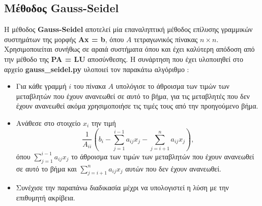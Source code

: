 \documentclass[First Project.tex]{subfiles}
\begin{document}
\subsection{ Μέθοδος \textlatin{\textbf{Gauss-Seidel}} }

Η μέθοδος \textlatin{\textbf{Gauss-Seidel}} αποτελεί μία επαναληπτική μέθοδος επίλυσης γραμμικών συστημάτων της μορφής \textlatin{\textbf{Ax = b}},
όπου $Α$ τετραγωνικός πίνακας $n \times n$. Χρησιμοποιείται συνήθως σε αραιά συστήματα όπου και έχει καλύτερη απόδοση από την μέθοδο της 
\textlatin{\textbf{PA = LU}} αποσύνθεσης. Η συνάρτηση που έχει υλοποιηθεί στο αρχείο \textlatin{\textbf{gauss\_seidel.py}} υλοποιεί τον 
παρακάτω αλγόριθμο :
\begin{itemize}
    \item Για κάθε γραμμή $i$ του πίνακα $Α$ υπολόγισε το άθροισμα των τιμών των μεταβλητών που έχουν ανανεωθεί σε αυτό το βήμα, για τις 
        μεταβλητές που δεν έχουν ανανεωθεί ακόμα χρησιμοποιήσε τις τιμές τους από την προηγούμενο βήμα.
    \item Ανάθεσε στο στοιχείο $x_{i}$ την τιμή 
    \begin{equation*}
            \frac{1}{A_{ii}}(b_{i} - \sum_{j=1}^{i-1} a_{ij}x_{j} - \sum_{j=i+1}^{n} a_{ij}x_{j}), 
    \end{equation*}
    όπου $\sum_{j=1}^{i-1} a_{ij}x_{j}$ το άθροισμα των τιμών των μεταβλητών που έχουν ανανεωθεί σε αυτό το βήμα και
    $\sum_{j=i+1}^{n} a_{ij}x_{j}$ αυτών που δεν έχουν ανανεωθεί.
    \item Συνέχισε την παραπάνω διαδικασία μέχρι να υπολογιστεί η λύση με την επιθυμητή ακρίβεια.
\end{itemize}
\end{document}
